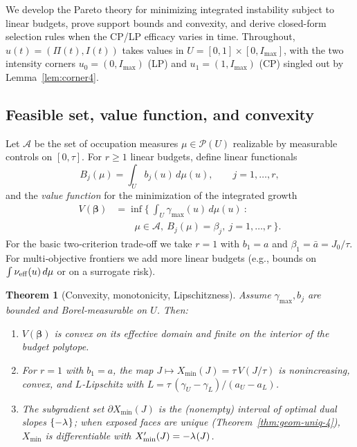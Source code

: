 \documentclass[aps,pre,twocolumn,showpacs,superscriptaddress]{revtex4-2}
\newtheorem{theorem}{Theorem}
\theoremstyle{definition}
\begin{document}
We develop the Pareto theory for minimizing integrated instability subject to linear budgets, prove support bounds and convexity, and derive closed-form selection rules when the CP/LP efficacy varies in time. Throughout, $u(t)=(\Pi(t),I(t))$ takes values in $U=[0,1]\times[0,I_{\max}]$, with the two intensity corners $u_0=(0,I_{\max})$ (LP) and $u_1=(1,I_{\max})$ (CP) singled out by Lemma~\ref{lem:corner4}.

\subsection{Feasible set, value function, and convexity}\label{subsec:feasible5}

Let $\mathcal{A}$ be the set of occupation measures $\mu\in\mathcal{P}(U)$ realizable by measurable controls on $[0,\tau]$. For $r\ge 1$ linear budgets, define linear functionals
\[
B_j(\mu)=\int_U b_j(u)\,d\mu(u),\qquad j=1,\dots,r,
\]
and the \emph{value function} for the minimization of the integrated growth
\begin{align}\label{eq:value5}
V(\bm{\beta})&=\inf\Big\{\ \int_U \gamma_{\max}(u)\,d\mu(u)\ :\nonumber\\
&\qquad\mu\in\mathcal{A},\ B_j(\mu)=\beta_j,\ j=1,\dots,r\ \Big\}.
\end{align}
For the basic two‑criterion trade‑off we take $r=1$ with $b_1=a$ and $\beta_1=\bar a=J_0/\tau$. For multi‑objective frontiers we add more linear budgets (e.g., bounds on $\int \nu_{\rm eff}(u)\,d\mu$ or on a surrogate risk).

\begin{theorem}[Convexity, monotonicity, Lipschitzness]\label{thm:convex5}
Assume $\gamma_{\max},b_j$ are bounded and Borel‑measurable on $U$. Then:
\begin{enumerate}[leftmargin=1.2em]
\item $V(\bm{\beta})$ is convex on its effective domain and finite on the interior of the budget polytope.
\item For $r=1$ with $b_1=a$, the map $J\mapsto X_{\min}(J)=\tau\,V(J/\tau)$ is nonincreasing, convex, and $L$‑Lipschitz with $L=\tau\,(\gamma_U-\gamma_L)/(a_U-a_L)$.
\item The subgradient set $\partial X_{\min}(J)$ is the (nonempty) interval of optimal dual slopes $\{-\lambda^{\*}\}$; when exposed faces are unique (Theorem~\ref{thm:geom-uniq-4}), $X_{\min}$ is differentiable with $X'_{\min}(J)=-\lambda^{\*}(J)$.
\end{enumerate}
\end{theorem}
\end{document}
